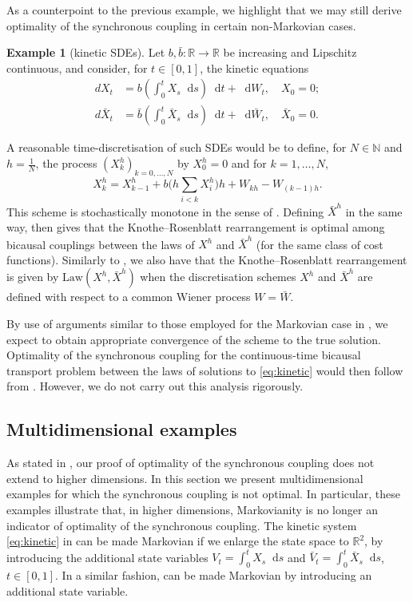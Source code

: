 \documentclass[oneside]{amsart}
\theoremstyle{definition}
\newtheorem{example}[theorem]{Example}
\newcommand{\Law}{\mathrm{Law}}
\newcommand{\N}{\mathbb N}
\newcommand{\R}{\mathbb R}
\newcommand{\di}{\mathop{}\!\mathrm{d}}
\def\R{{\mathbb R}}
\numberwithin{equation}{section}
\begin{document}
	
	As a counterpoint to the previous example, we highlight that we may still derive optimality of the synchronous coupling in certain non-Markovian cases.
	
	\begin{example}[kinetic SDEs]\label{ex:kinetic}
	Let $b, \bar b\colon \R \to \R$ be increasing and Lipschitz continuous, and consider, for $t \in [0, 1]$, the kinetic equations
	\begin{equation}\label{eq:kinetic}
		\begin{split}
			dX_t& = b\!\left( \int_0^t X_s\di s \right)\di t+\di W_t, \quad X_0=0; \\
			d\bar X_t &= \bar b\!\left( \int_0^t \bar X_s\di s \right)\di t+\di \bar W_t, \quad \bar X_0=0.
		\end{split}
	\end{equation}
	
	A reasonable time-discretisation of such SDEs would be to define, for $N \in \N$ and $h = \frac{1}{N}$, the process $(X^h_k)_{k = 0, \dotsc, N}$ by $X^h_0=0$ and for $k = 1, \dotsc, N$,
\[
X^h_{k} = X^h_{k-1} + b\bigg( h\sum_{i< k} X^h_i\bigg)h + W_{kh} - W_{(k-1)h}.
\]
This scheme is stochastically monotone in the sense of . Defining $\bar X^h$ in the same way,  then gives that the Knothe--Rosenblatt rearrangement is optimal among bicausal couplings between the laws of $X^h$ and $\bar X^h$ (for the same class of cost functions).
	Similarly to , we also have that the Knothe--Rosenblatt rearrangement is given by $\Law(X^h, \bar X^h)$ when the discretisation schemes $X^h$ and $\bar X^h$ are defined with respect to a common Wiener process $W = \bar W$.
	
	By use of arguments similar to those employed for the Markovian case in , we expect to obtain appropriate convergence of the scheme to the true solution. Optimality of the synchronous coupling for the continuous-time bicausal transport problem between the laws of solutions to \eqref{eq:kinetic} would then follow from . However, we do not carry out this analysis rigorously. 
	\end{example}
	
	
	\subsection{Multidimensional examples}
	
		As stated in , our proof of optimality of the synchronous coupling does not extend to higher dimensions. In this section we present multidimensional examples for which the synchronous coupling is not optimal.
		In particular, these examples illustrate that, in higher dimensions, Markovianity is no longer an indicator of optimality of the synchronous coupling. 
		The kinetic system \eqref{eq:kinetic} in  can be made Markovian if we enlarge the state space to $\R^2$, by introducing the additional state variables $V_t=\int_0^t X_s\di s$ and $\bar V_t=\int_0^t \bar X_s\di s$, $t \in [0, 1]$. 
		In a similar fashion,  can be made Markovian by introducing an additional state variable.
		
\end{document}
